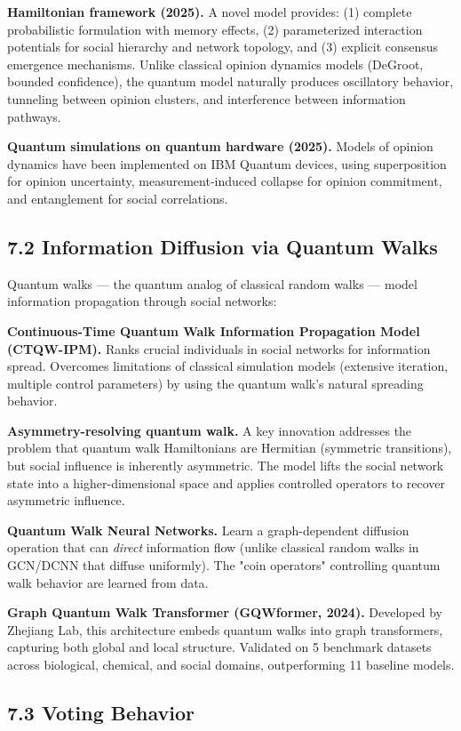 \documentclass[11pt]{article}
\begin{document}
\textbf{Hamiltonian framework (2025).} A novel model provides: (1) complete probabilistic
formulation with memory effects, (2) parameterized interaction potentials for
social hierarchy and network topology, and (3) explicit consensus emergence
mechanisms. Unlike classical opinion dynamics models (DeGroot, bounded confidence),
the quantum model naturally produces oscillatory behavior, tunneling between
opinion clusters, and interference between information pathways.

\textbf{Quantum simulations on quantum hardware (2025).} Models of opinion dynamics have
been implemented on IBM Quantum devices, using superposition for opinion
uncertainty, measurement-induced collapse for opinion commitment, and entanglement
for social correlations.
\subsection{7.2 Information Diffusion via Quantum Walks}
\label{sec:org83ad26e}

Quantum walks --- the quantum analog of classical random walks --- model
information propagation through social networks:

\textbf{Continuous-Time Quantum Walk Information Propagation Model (CTQW-IPM).} Ranks
crucial individuals in social networks for information spread. Overcomes
limitations of classical simulation models (extensive iteration, multiple control
parameters) by using the quantum walk's natural spreading behavior.

\textbf{Asymmetry-resolving quantum walk.} A key innovation addresses the problem that
quantum walk Hamiltonians are Hermitian (symmetric transitions), but social
influence is inherently asymmetric. The model lifts the social network state
into a higher-dimensional space and applies controlled operators to recover
asymmetric influence.

\textbf{Quantum Walk Neural Networks.} Learn a graph-dependent diffusion operation that
can \emph{direct} information flow (unlike classical random walks in GCN/DCNN that
diffuse uniformly). The "coin operators" controlling quantum walk behavior are
learned from data.

\textbf{Graph Quantum Walk Transformer (GQWformer, 2024).} Developed by Zhejiang Lab,
this architecture embeds quantum walks into graph transformers, capturing both
global and local structure. Validated on 5 benchmark datasets across biological,
chemical, and social domains, outperforming 11 baseline models.
\subsection{7.3 Voting Behavior}
\label{sec:org8c0d38a}
\end{document}
